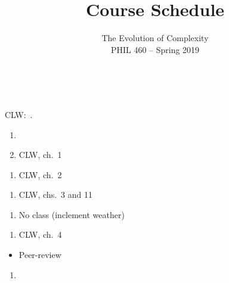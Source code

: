 \documentclass{article}
\author{\large The Evolution of Complexity\\ \normalsize PHIL 460 -- Spring 2019}
\date{}
\title{\bf Course Schedule\vspace{-0.5em}}
\begin{document}
\maketitle
\onehalfspacing{}





\ \newline{}

\noindent CLW:\ .


\dia{}
\NR{}

\dia{}
\begin{enumerate}
\item {}
\item CLW, ch.~1
\end{enumerate}

\dia{}
\begin{enumerate}
\item CLW, ch.~2
\end{enumerate}

\dia{}
\begin{enumerate}
\item CLW, chs.~3 and 11
\end{enumerate}

\dia{}
\begin{enumerate}
\item[ ] No class (inclement weather)
\end{enumerate}

\dia{}
\begin{enumerate}
\item CLW, ch.~4
\end{enumerate}


\dia{}
\begin{itemize}
\item[ ] Peer-review
\end{itemize}

\dia{}
\begin{enumerate}
\item {}
\end{enumerate}
\end{document}
